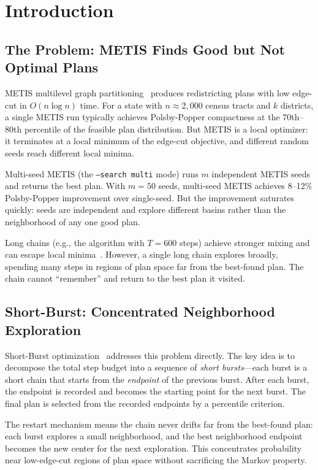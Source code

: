 \section{Introduction}
\label{sec:introduction}

\subsection{The Problem: METIS Finds Good but Not Optimal Plans}

METIS multilevel graph partitioning~\citep{b11paper} produces redistricting
plans with low edge-cut in $O(n \log n)$ time.
For a state with $n \approx 2{,}000$ census tracts and $k$ districts,
a single METIS run typically achieves Polsby-Popper compactness at the
70th--80th percentile of the feasible plan distribution.
But METIS is a local optimizer: it terminates at a local minimum of the
edge-cut objective, and different random seeds reach different local minima.

Multi-seed METIS (the \texttt{--search multi} mode) runs $m$ independent
METIS seeds and returns the best plan.
With $m = 50$ seeds, multi-seed METIS achieves 8--12\% Polsby-Popper
improvement over single-seed.
But the improvement saturates quickly: seeds are independent and explore
different basins rather than the neighborhood of any one good plan.

Long \recom{} chains (e.g., the \cs{} algorithm with $T = 600$ steps)
achieve stronger mixing and can escape local minima~\citep{b16paper}.
However, a single long chain explores broadly, spending many steps
in regions of plan space far from the best-found plan.
The chain cannot ``remember'' and return to the best plan it visited.

\subsection{Short-Burst: Concentrated Neighborhood Exploration}

Short-Burst optimization~\citep{cannon2022} addresses this problem directly.
The key idea is to decompose the total step budget into a sequence of
\emph{short bursts}---each burst is a short \recom{} chain that starts
from the \emph{endpoint} of the previous burst.
After each burst, the endpoint is recorded and becomes the starting point
for the next burst.
The final plan is selected from the recorded endpoints by a percentile
criterion.

The restart mechanism means the chain never drifts far from the best-found
plan: each burst explores a small neighborhood, and the best neighborhood
endpoint becomes the new center for the next exploration.
This concentrates probability near low-edge-cut regions of plan space
without sacrificing the Markov property.

